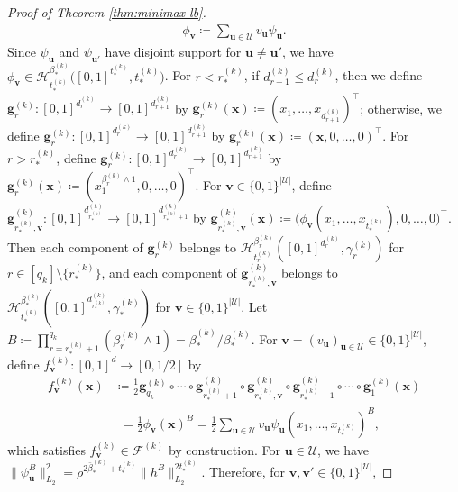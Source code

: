 \documentclass[12pt]{article}
\begin{document}
\begin{proof}[Proof of Theorem \ref{thm:minimax-lb}]
    \begin{align*}
        \phi_{\bm v} \coloneqq \sum_{\bm u \in \mathcal{U}} v_{\bm u} \psi_{\bm u}.
    \end{align*}
    Since $\psi_{\bm u}$ and $\psi_{\bm u'}$ have disjoint support for $\bm u \neq \bm u'$, we have $\phi_{\bm v} \in \mathcal{H}_{t_*^{(k)}}^{\beta_*^{(k)}}\bigl([0,1]^{t_*^{(k)}}, t_*^{(k)}\bigr)$.
    For $r< r_*^{(k)}$, if $d_{r+1}^{(k)} \leq d_{r}^{(k)}$, then we define $\bm g_r^{(k)} : [0,1]^{d_{r}^{(k)}} \to [0,1]^{d_{r+1}^{(k)}}$ by $\bm g_r^{(k)}(\bm x) \coloneqq (x_1,\ldots,x_{d_{r+1}^{(k)}})^\top$; otherwise, we define $\bm g_r^{(k)} : [0,1]^{d_{r}^{(k)}} \to [0,1]^{d_{r+1}^{(k)}}$ by $\bm g_r^{(k)}(\bm x) \coloneqq (\bm x, 0,\ldots,0)^\top$.  For $r > r_*^{(k)}$, define $\bm g_r^{(k)} : [0,1]^{d_{r}^{(k)}} \to [0,1]^{d_{r+1}^{(k)}}$ by $\bm g_r^{(k)}(\bm x) \coloneqq (x_1^{\beta_r^{(k)} \wedge 1}, 0,\ldots,0)^\top$. For $\bm v \in \{0,1\}^{|\mathcal{U}|}$, define $\bm g_{r_*^{(k)},\bm v}^{(k)}: [0,1]^{d_{r_*^{(k)}}^{(k)}} \to [0,1]^{d_{r_*^{(k)}+1}^{(k)}}$ by $\bm g_{r_*^{(k)},\bm v}^{(k)}(\bm x) \coloneqq \bigl(\phi_{\bm v}(x_1,\ldots,x_{t_*^{(k)}}), 0, \ldots, 0\bigr)^\top$.
    Then each component of $\bm g_r^{(k)}$ belongs to $\mathcal{H}_{t^{(k)}_r}^{\beta^{(k)}_r} ([0,1]^{d_{r}^{(k)}}, \gamma^{(k)}_r)$ for $r\in[q_k] \setminus \{r_*^{(k)}\}$, and each component of $\bm g_{r_*^{(k)},\bm{v}}^{(k)}$ belongs to $\mathcal{H}_{t^{(k)}_{*}}^{\beta^{(k)}_*} ([0,1]^{d_{r_*^{(k)}}^{(k)}}, \gamma^{(k)}_*)$ for $\bm{v} \in \{0,1\}^{|\mathcal{U}|}$. Let $B \coloneqq \prod_{r=r_*^{(k)}+1}^{q_k} (\beta_r^{(k)} \wedge 1) = \bar{\beta}_*^{(k)} / \beta_*^{(k)}$. For $\bm v = (v_{\bm u})_{\bm u \in \mathcal{U}} \in \{0,1\}^{|\mathcal{U}|}$, define $f^{(k)}_{\bm v} : [0,1]^d \to [0,1/2]$ by
    \begin{align*}
        f^{(k)}_{\bm v}(\bm x) &\coloneqq \frac{1}{2}\bm g_{q_k}^{(k)} \circ \cdots \circ \bm g_{r_*^{(k)}+1}^{(k)} \circ \bm g_{r_*^{(k)},\bm v}^{(k)} \circ \bm g_{r_*^{(k)}-1}^{(k)} \circ \cdots \circ \bm g_{1}^{(k)}(\bm x)\\
        &\phantom{:}= \frac{1}{2}\phi_{\bm v}(\bm x)^B = \frac{1}{2}\sum_{\bm u \in \mathcal{U}} v_{\bm u} \psi_{\bm u}(x_1,\ldots,x_{t_*^{(k)}})^B,
    \end{align*}
    which satisfies $f^{(k)}_{\bm v} \in \mathcal{F}^{(k)}$ by construction.
    For $\bm u \in \mathcal{U}$, we have $\|\psi_{\bm u}^B\|_{L_2}^2 = \rho^{2\bar{\beta}_*^{(k)} + t_*^{(k)}} \|h^B\|_{L_2}^{2t_*^{(k)}}$. Therefore, for $\bm v, \bm v' \in \{0,1\}^{|\mathcal{U}|}$,

\end{proof}
\end{document}

